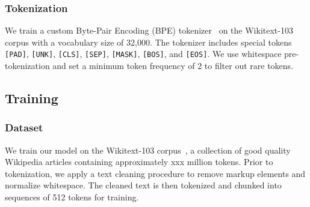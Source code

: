 \subsubsection{Tokenization}
We train a custom Byte-Pair Encoding (BPE) tokenizer~\cite{sennrich2016neural} on the Wikitext-103 corpus with a vocabulary size of 32,000. The tokenizer includes special tokens \texttt{[PAD]}, \texttt{[UNK]}, \texttt{[CLS]}, \texttt{[SEP]}, \texttt{[MASK]}, \texttt{[BOS]}, and \texttt{[EOS]}. We use whitespace pre-tokenization and set a minimum token frequency of 2 to filter out rare tokens.
\subsection{Training}
\subsubsection{Dataset}
We train our model on the Wikitext-103 corpus~\cite{merity2016pointer}, a collection of good quality Wikipedia articles containing approximately xxx million tokens. Prior to tokenization, we apply a text cleaning procedure to remove markup elements and normalize whitespace. The cleaned text is then tokenized and chunked into sequences of 512 tokens for training.
